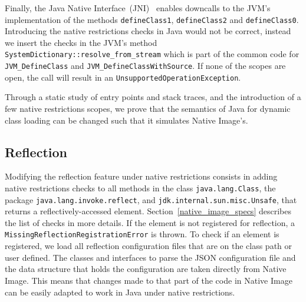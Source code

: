 Finally,  the Java Native Interface~(JNI)~\cite{noauthor_jni_nodate} enables downcalls to the JVM's implementation of the methods \verb|defineClass1|, \verb|defineClass2| and \verb|defineClass0|. Introducing the native restrictions checks in Java would not be correct, instead we insert the checks in the JVM's method \verb|SystemDictionary::resolve_from_stream| which is part of the common code for \verb|JVM_DefineClass| and \verb|JVM_DefineClassWithSource|. If none of the scopes are open, the call will result in an \verb|UnsupportedOperationException|. 

Through a static study of entry points and stack traces, and the introduction of a few native restrictions scopes, we prove that the semantics of Java for dynamic class loading can be changed such that it simulates Native Image's.

\subsection{Reflection}
Modifying the reflection feature under native restrictions consists in adding native restrictions checks to all methods in the class \verb|java.lang.Class|, the package \verb|java.lang.invoke.reflect|, and \verb|jdk.internal.sun.misc.Unsafe|, that returns a reflectively-accessed element. Section~\ref{native_image_specs} describes the list of checks in more details. 
If the element is not registered for reflection, a \verb|MissingReflectionRegistrationError| is thrown.
To check if an element is registered, we load all reflection configuration files that are on the class path or user defined. The classes and interfaces to parse the JSON configuration file and the data structure that holds the configuration are taken directly from Native Image. This means that changes made to that part of the code in Native Image can be easily adapted to work in Java under native restrictions.

